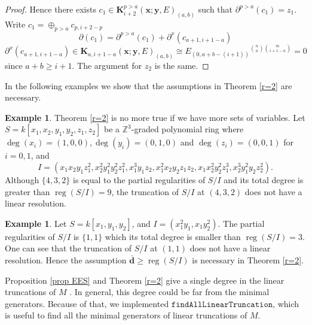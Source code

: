 \documentclass[11pt]{amsart}
\DeclareMathOperator{\reg}{reg}
\theoremstyle{definition}
\newtheorem{example}[thm]{Example}
\begin{document}
\begin{proof}
Hence there exists $c_1\in \textbf{K}^{p>a}_{i+2}(\textbf{x};\textbf{y},E)_{(a,b)}$ such that $\partial^{p>a}(c_1)= z_1$. Write $c_1= \oplus_{p>a}c_{p,i+2-p} $
$$
\partial(c_1)= \partial^{p>a}(c_1)+ \partial^x(c_{a+1,i+1-a})
$$
$\partial^x(c_{a+1,i+1-a})\in \textbf{K}_{a, i+1-a}(\textbf{x};\textbf{y},E)_{(a,b)}\cong {E_{(0, a+b-(i+1))}}^{\binom{n}{a}\binom{m}{i+1-a}}=0$ since $a+b\geq i+1$. The argument for $z_2$ is the same.
\end{proof}
In the following examples we show that the assumptions in Theorem \ref{r=2} are necessary.
\begin{example}
Theorem \autoref{r=2} is no more true if we have more sets of variables. Let $ S = k[x_1,x_2,y_1,y_2,z_1,z_2]$ be a $\mathbb{Z}^3$-graded polynomial ring where $\deg(x_i)=(1,0,0), \deg(y_i)= (0,1,0)$ and $\deg(z_i)=(0,0,1)$ for $i=0,1$, and 
  $$I = (x_1x_2y_1z_1^2, x_2^2y_1^2y_2^2z_1^2, x_1^3y_1z_2, x_1^2x_2y_2z_1z_2,
 x_1x_2^2y_2^2z_1^3, x_2^3y_1^2y_2z_2^2).
 $$
Although $\{4,3,2\}$ is equal to the partial regularities of $S/I$ and its total degree is greater than  $\reg(S/I)=9$, the truncation of $S/I$ at $(4,3,2)$ does not have a linear resolution. 


\end{example}
\begin{example}
Let $S=k[x_1,y_1,y_2]$, and $I= (x_1^2y_1, x_1y_2^2)$. The partial regularities of $S/I$ is $\{1,1\}$ which its total degree is smaller than $\reg (S/I)=3$.  One can see that the truncation of $S/I$ at $(1,1)$ does not have a linear resolution. Hence the assumption $\bar{\textbf{d}}\geq \reg(S/I)$ is necessary in Theorem \autoref{r=2}.

\end{example}

Proposition \autoref{prop EES} and Theorem \autoref{r=2} give a single degree in the linear truncations of $M$ . In general, this degree could be far from the minimal generators. Because of that, we implemented $\mathtt{findAllLinearTruncation}$, which is useful to find all the minimal generators of linear truncations of $M$.
\end{document}
